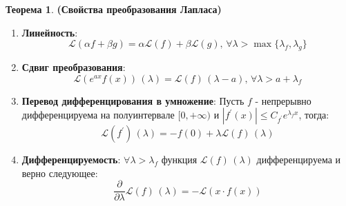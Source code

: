 \documentclass[12pt]{article}
\newcommand{\ML}{\mathcal{L}}
\theoremstyle{definition}
\newtheorem{theorem}{Теорема}
\begin{document}
\begin{theorem}\textbf{(Свойства преобразования Лапласа)}
	\begin{enumerate}[label ={(\arabic*)}]
		\item{\textbf{Линейность}:} 
		$$
			\ML(\alpha f + \beta g) = \alpha\ML(f) + \beta\ML(g), \,\forall \lambda > \max\{\lambda_f, \lambda_g\}
		$$
		
		\item{\textbf{Сдвиг преобразования}:} 
		$$
			\ML(e^{ax}f(x))\,(\lambda) = \ML(f)\, (\lambda - a), \, \forall	\lambda > a + \lambda_f
		$$
	
		\item{\textbf{Перевод дифференцирования в умножение}:} Пусть $f$ - непрерывно дифференцируема на полуинтервале $[0, +\infty)$ и $|f^\prime(x)| \leq C_{f^\prime}e^{\lambda_f x}$, тогда: 
		$$
			\ML(f^\prime)\, (\lambda) = - f(0) + \lambda \ML(f)\, (\lambda)
		$$
		
		\item{\textbf{Дифференцируемость}:} $\forall \lambda > \lambda_f$ функция $\ML(f)\,(\lambda)$ дифференцируема и верно следующее:
		$$
			\dfrac{\partial}{\partial \lambda}\ML(f)\,(\lambda) = - \ML(x {\cdot} f(x))
		$$
	\end{enumerate}
\end{theorem}
\newpage
\end{document}
